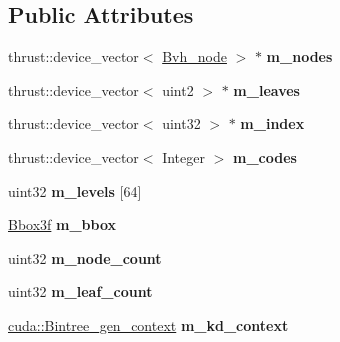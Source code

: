 \subsection*{\-Public \-Attributes}
\begin{DoxyCompactItemize}
\item 
\hypertarget{structnih_1_1cuda_1_1_l_b_v_h__builder_a0b8eb3c5e55eb1c1b41745eebb6d5fe8}{
thrust\-::device\-\_\-vector$<$ \hyperlink{structnih_1_1_bvh__node}{\-Bvh\-\_\-node} $>$ $\ast$ {\bfseries m\-\_\-nodes}}
\label{structnih_1_1cuda_1_1_l_b_v_h__builder_a0b8eb3c5e55eb1c1b41745eebb6d5fe8}

\item 
\hypertarget{structnih_1_1cuda_1_1_l_b_v_h__builder_a6c9e55bc74cd538a570545b6e3d844d1}{
thrust\-::device\-\_\-vector$<$ uint2 $>$ $\ast$ {\bfseries m\-\_\-leaves}}
\label{structnih_1_1cuda_1_1_l_b_v_h__builder_a6c9e55bc74cd538a570545b6e3d844d1}

\item 
\hypertarget{structnih_1_1cuda_1_1_l_b_v_h__builder_adffd2893f591cbfdf739f4fed2286114}{
thrust\-::device\-\_\-vector$<$ uint32 $>$ $\ast$ {\bfseries m\-\_\-index}}
\label{structnih_1_1cuda_1_1_l_b_v_h__builder_adffd2893f591cbfdf739f4fed2286114}

\item 
\hypertarget{structnih_1_1cuda_1_1_l_b_v_h__builder_a376c30ff9138469f55d9430a16515688}{
thrust\-::device\-\_\-vector$<$ \-Integer $>$ {\bfseries m\-\_\-codes}}
\label{structnih_1_1cuda_1_1_l_b_v_h__builder_a376c30ff9138469f55d9430a16515688}

\item 
\hypertarget{structnih_1_1cuda_1_1_l_b_v_h__builder_a352b7b543cdf20e82f8eb7b54cfd8eff}{
uint32 {\bfseries m\-\_\-levels} \mbox{[}64\mbox{]}}
\label{structnih_1_1cuda_1_1_l_b_v_h__builder_a352b7b543cdf20e82f8eb7b54cfd8eff}

\item 
\hypertarget{structnih_1_1cuda_1_1_l_b_v_h__builder_afa6951af58c2fad682f53a49a532ebed}{
\hyperlink{structnih_1_1_bbox}{\-Bbox3f} {\bfseries m\-\_\-bbox}}
\label{structnih_1_1cuda_1_1_l_b_v_h__builder_afa6951af58c2fad682f53a49a532ebed}

\item 
\hypertarget{structnih_1_1cuda_1_1_l_b_v_h__builder_a3c66a96b0e21e87163c1eaf05ae6d141}{
uint32 {\bfseries m\-\_\-node\-\_\-count}}
\label{structnih_1_1cuda_1_1_l_b_v_h__builder_a3c66a96b0e21e87163c1eaf05ae6d141}

\item 
\hypertarget{structnih_1_1cuda_1_1_l_b_v_h__builder_aeb2d4f7c26131c35dc2027af6c77c7f3}{
uint32 {\bfseries m\-\_\-leaf\-\_\-count}}
\label{structnih_1_1cuda_1_1_l_b_v_h__builder_aeb2d4f7c26131c35dc2027af6c77c7f3}

\item 
\hypertarget{structnih_1_1cuda_1_1_l_b_v_h__builder_aa81c7e2cd1d6736939028e783d126281}{
\hyperlink{structnih_1_1cuda_1_1_bintree__gen__context}{cuda\-::\-Bintree\-\_\-gen\-\_\-context} {\bfseries m\-\_\-kd\-\_\-context}}
\label{structnih_1_1cuda_1_1_l_b_v_h__builder_aa81c7e2cd1d6736939028e783d126281}

\end{DoxyCompactItemize}


